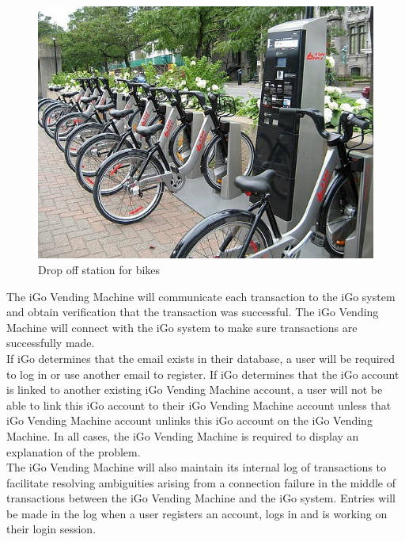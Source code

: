 \begin{figure}[H]
    \centering
    \includegraphics[scale=0.40]{images/BixiStation.png}
    \caption{Drop off station for bikes}
\end{figure}



The iGo Vending Machine will communicate each transaction to the iGo system and obtain verification that the transaction was successful. The iGo Vending Machine will connect with the iGo system to make sure transactions are successfully made.\\
If iGo determines that the email exists in their database, a user will be required to log in or use another email to register. If iGo determines that the iGo account is linked to another existing iGo Vending Machine account, a user will not be able to link this iGo account to their iGo Vending Machine account unless that iGo Vending Machine account unlinks this iGo account on the iGo Vending Machine. In all cases, the iGo Vending Machine is required to display an explanation of the problem.\\
The iGo Vending Machine will also maintain its internal log of transactions to facilitate resolving ambiguities arising from a connection failure in the middle of transactions between the iGo Vending Machine and the iGo system. Entries will be made in the log when a user registers an account, logs in and is working on their login session.



